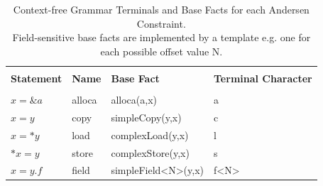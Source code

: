 \begin{table}
    \begin{center}
        \begin{tabular}{l|l|l|l}
            \hline                                                                                 \\
            \textbf{Statement} & \textbf{Name} & \textbf{Base Fact}  & \textbf{Terminal Character} \\
            \hline                                                                                 \\
            $x = \&a$          & alloca        & alloca(a,x)         & a                           \\
            $x = y$            & copy          & simpleCopy(y,x)     & c                           \\
            $x = *y$           & load          & complexLoad(y,x)    & l                           \\
            $*x = y$           & store         & complexStore(y,x)   & s                           \\
            $x = y.f$          & field         & simpleField<N>(y,x) & f<N>                        \\
        \end{tabular}
    \end{center}
    \caption[Overview of CFG Terminals for Andersen Constraints]{Context-free Grammar Terminals and Base Facts for each Andersen Constraint.\\Field-sensitive base facts are implemented by a template e.g. one for each possible offset value N.}
    \label{tab:cfl-ander}
\end{table}

